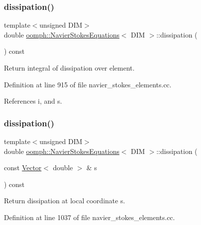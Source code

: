 \subsubsection{\texorpdfstring{dissipation()}{dissipation()}\hspace{0.1cm}{\footnotesize\ttfamily [1/2]}}
{\footnotesize\ttfamily template$<$unsigned D\+IM$>$ \\
double \hyperlink{classoomph_1_1NavierStokesEquations}{oomph\+::\+Navier\+Stokes\+Equations}$<$ D\+IM $>$\+::dissipation (\begin{DoxyParamCaption}{ }\end{DoxyParamCaption}) const}



Return integral of dissipation over element. 



Definition at line 915 of file navier\+\_\+stokes\+\_\+elements.\+cc.



References i, and s.

\mbox{\label{classoomph_1_1NavierStokesEquations_ac747021b481794f294bbb9cd2d72bf3f}} 
\subsubsection{\texorpdfstring{dissipation()}{dissipation()}\hspace{0.1cm}{\footnotesize\ttfamily [2/2]}}
{\footnotesize\ttfamily template$<$unsigned D\+IM$>$ \\
double \hyperlink{classoomph_1_1NavierStokesEquations}{oomph\+::\+Navier\+Stokes\+Equations}$<$ D\+IM $>$\+::dissipation (\begin{DoxyParamCaption}\item[{const \hyperlink{classoomph_1_1Vector}{Vector}$<$ double $>$ \&}]{s }\end{DoxyParamCaption}) const}



Return dissipation at local coordinate s. 



Definition at line 1037 of file navier\+\_\+stokes\+\_\+elements.\+cc.



